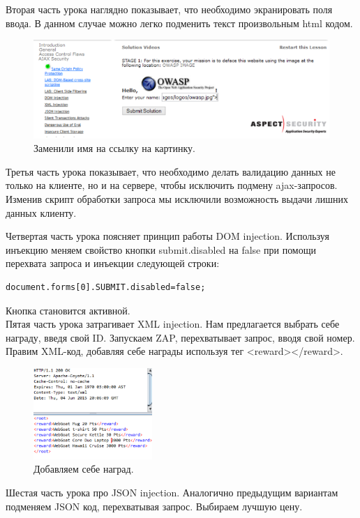 \documentclass[utf8x, 12pt]{G7-32}
\begin{document}
Вторая часть урока наглядно показывает, что необходимо экранировать поля ввода. В данном случае можно легко подменить текст произвольным html кодом.
\begin{figure}[hhh!]
\centering
\includegraphics[width=\textwidth]{rsrc/4_1}
\caption{Заменили имя на ссылку на картинку.}
\end{figure}

Третья часть урока показывает, что необходимо делать валидацию данных не только на клиенте, но и на сервере, чтобы исключить подмену ajax-запросов. Изменив скрипт обработки запроса мы исключили возможность выдачи лишних данных клиенту.

Четвертая часть урока поясняет принцип работы DOM injection. Используя инъекцию меняем свойство кнопки submit.disabled на false при помощи перехвата запроса и инъекции следующей строки:
\begin{lstlisting}
document.forms[0].SUBMIT.disabled=false;
\end{lstlisting}
Кнопка становится активной.\\

Пятая часть урока затрагивает XML injection. Нам предлагается выбрать себе награду, введя свой ID. Запускаем ZAP, перехватывает запрос, вводя свой номер. Правим XML-код, добавляя себе награды используя тег <reward></reward>.
\begin{figure}[h!]
\centering
\includegraphics[width=0.4\textwidth]{rsrc/5_1}
\caption{Добавляем себе наград.}
\end{figure}

\newpage
Шестая часть урока про JSON injection. Аналогично предыдущим вариантам подменяем JSON код, перехватывая запрос. Выбираем лучшую цену.
\end{document}
